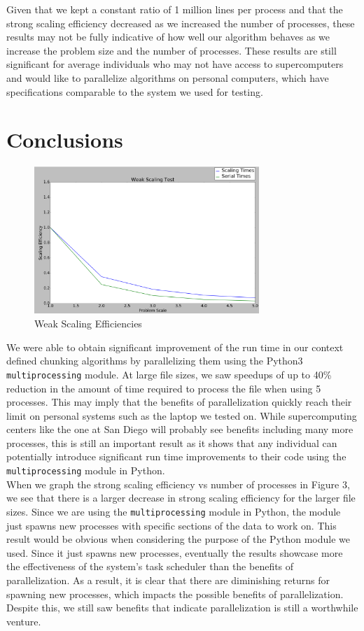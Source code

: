 \documentclass{acmtog} %
\begin{document}
	Given that we kept a constant ratio of 1 million lines per process and that the strong scaling efficiency decreased as we increased the number of processes, these results may not be fully indicative of how well our algorithm behaves as we increase the problem size and the number of processes. These results are still significant for average individuals who may not have access to supercomputers and would like to parallelize algorithms on personal computers, which have specifications comparable to the system we used for testing. 
	
	\section{Conclusions}
			\begin{figure}
				\centerline{\includegraphics[width=8.5cm]{img/WeakScaling}}
				\caption{Weak Scaling Efficiencies}
				\label{fig:weakscale}
			\end{figure}
	We were able to obtain significant improvement of the run time in our context defined chunking algorithms by parallelizing them using the Python3 \texttt{multiprocessing} module. At large file sizes, we saw speedups of up to 40\% reduction in the amount of time required to process the file when using 5 processes. This may imply that the benefits of parallelization quickly reach their limit on personal systems such as the laptop we tested on. While supercomputing centers like the one at San Diego will probably see benefits including many more processes, this is still an important result as it shows that any individual can potentially introduce significant run time improvements to their code using the \texttt{multiprocessing} module in Python. \\
	
	When we graph the strong scaling efficiency vs number of processes in Figure 3, we see that there is a larger decrease in strong scaling efficiency for the larger file sizes. Since we are using the \texttt{multiprocessing} module in Python, the module just spawns new processes with specific sections of the data to work on. This result would be obvious when considering the purpose of the Python module we used. Since it just spawns new processes, eventually the results showcase more the effectiveness of the system's task scheduler than the benefits of parallelization. As a result, it is clear that there are diminishing returns for spawning new processes, which impacts the possible benefits of parallelization. Despite this, we still saw benefits that indicate parallelization is still a worthwhile venture. \\
	
\end{document}
